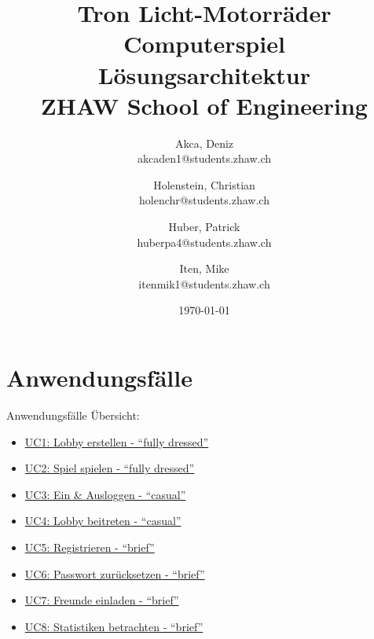 \documentclass[11pt,ngerman]{article}
\newcommand{\quotes}[1]{``#1''}
\begin{document}
    \title{Tron Licht-Motorräder Computerspiel\\
        \vspace{1cm}
        Lösungsarchitektur \\
        \vspace{0.5cm}
        \small{}ZHAW  School of Engineering
        \vspace{1.5cm}
    }
    \author{
        Akca, Deniz\\
        \small{akcaden1@students.zhaw.ch}
        \and
        Holenstein, Christian\\
        \small{holenchr@students.zhaw.ch}
        \and
        Huber, Patrick\\
        \small{huberpa4@students.zhaw.ch}
        \and
        Iten, Mike\\
        \small{itenmik1@students.zhaw.ch}
        \vspace{1.5cm}
    }
   \date{\today}

    \maketitle
    \newpage

    \tableofcontents
    \listoftables
    \listoffigures
    \newpage

    \section{Anwendungsfälle}
        Anwendungsfälle Übersicht:
        \begin{multicols}{2}
            \begin{itemize}
               \item  \hyperref[ssec:UC1Lobbyerstellen]{UC1: Lobby erstellen - \quotes{fully dressed}}
                \item\hyperref[ssec:UC2Spielspielen]{UC2: Spiel spielen - \quotes{fully dressed}}
                \item \hyperref[sssec:UC3EinAusloggen]{UC3: Ein \& Ausloggen  - \quotes{casual}}
                \item \hyperref[sssec:UC4Lobbybeitreten]{UC4: Lobby beitreten - \quotes{casual}}
                \item \hyperref[sssec:UC5Registrieren]{UC5: Registrieren - \quotes{brief}}
                \item \hyperref[sssec:UC6Passwortsetzen]{UC6: Passwort zurücksetzen - \quotes{brief}}
                \item  \hyperref[sssec:UC7Freundeeinladen]{UC7: Freunde einladen - \quotes{brief}}
                \item \hyperref[sssec:UC8Statistikenbetrachten]{UC8: Statistiken betrachten - \quotes{brief}}
           \end{itemize}
        \end{multicols}
\end{document}
